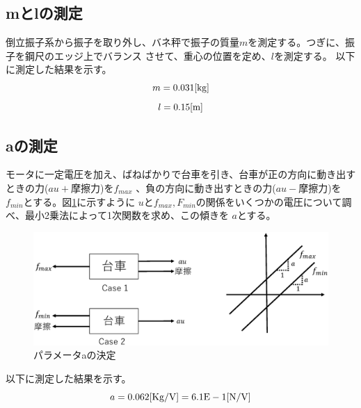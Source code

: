 \subsection{mとlの測定}
	倒立振子系から振子を取り外し、バネ秤で振子の質量$m$を測定する。つぎに、振子を鋼尺のエッジ上でバランス
	させて、重心の位置を定め、$l$を測定する。
	以下に測定した結果を示す。
	\[m = 0.031[\rm{kg}]\]
	\[l = 0.15[\rm{m}]\]
\subsection{aの測定}
	モータに一定電圧を加え、ばねばかりで台車を引き、台車が正の方向に動き出すときの力($au+摩擦力$)を$f_{max}$
	、負の方向に動き出すときの力($au-摩擦力$)を$f_{min}$とする。図\ref{image:parameterA}に示すように
	$u$と$f_{max},F_{min}$の関係をいくつかの電圧について調べ、最小2乗法によって1次関数を求め、この傾きを
	$a$とする。
	\begin{figure}[H]
		\centering
		\includegraphics[width=1.0\linewidth]{gazo/ParameterA.eps}
		\caption{パラメータaの決定}
		\label{image:parameterA}
	\end{figure}
	以下に測定した結果を示す。
	\[
		a=0.062[\rm{Kg/V}] = 6.1E-1[\rm{N/V}
	]\]
	
